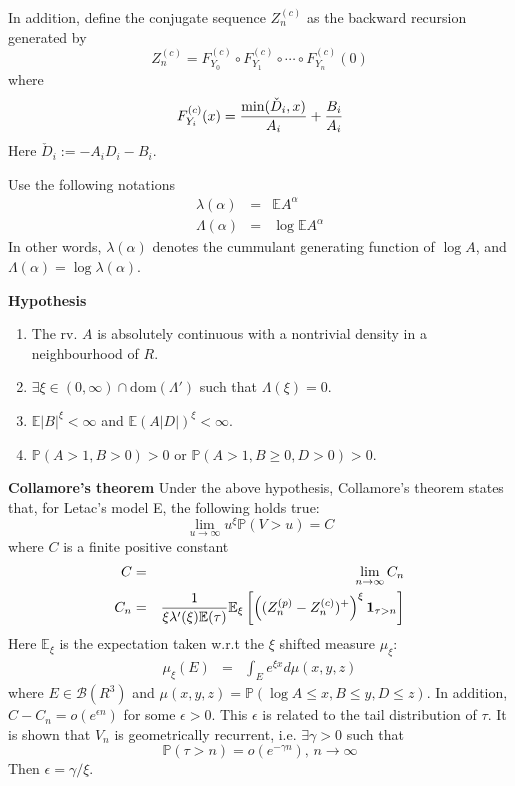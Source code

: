 \documentclass[12pt]{article}
\newcommand{\E}{
        \mathbb{E}
}
\newcommand{\p}{
        \mathbb{P}
}
\newcommand{\I}[1]{
        \mathbf 1_{#1}
}
\newcommand{\dom}{
        \text{dom}
}
\begin{document}
In addition, define the conjugate sequence $Z^{(c)}_n$ as
the backward recursion generated by
\[
Z^{(c)}_n = F^{(c)}_{Y_0} \circ F^{(c)}_{Y_1} \circ \cdots
\circ F^{(c)}_{Y_n}(0)
\]
where
\[
F^{(c)}_{Y_i}(x) = {\min(\check D_i, x) \over A_i} + {B_i \over A_i}
\]
Here $\check D_i := -A_i D_i - B_i$.

Use the following notations
\begin{eqnarray*}
\lambda(\alpha) &=& \E A^\alpha \\
\Lambda(\alpha) &=& \log \E A^\alpha
\end{eqnarray*}
In other words, $\lambda(\alpha)$ denotes the cummulant generating
function of $\log A$, and $\Lambda(\alpha) = \log \lambda(\alpha)$.

{\bf Hypothesis}
\begin{enumerate}
\item The rv. $A$ is absolutely continuous with a nontrivial
      density in a neighbourhood of $R$.
\item $\exists \xi \in (0, \infty) \cap \dom(\Lambda')$ such that
      $\Lambda(\xi) = 0$.
\item $\E|B|^\xi < \infty$ and $\E(A|D|)^\xi < \infty$.
\item $\p(A > 1, B > 0) > 0$ or $\p(A > 1, B \geq 0, D > 0) > 0$.
\end{enumerate}

{\bf Collamore's theorem}
Under the above hypothesis, Collamore's theorem states that, for
Letac's model E, the following holds true:
\[
\lim_{u \to \infty} u^\xi \p(V > u) = C
\]
where $C$ is a finite positive constant
\begin{eqnarray*}
  C &=& \lim_{n \to \infty} C_n \\
  C_n &=&     {1 \over \xi \lambda'(\xi) \E(\tau)}
    \E_\xi \left[
    \left(
    (Z^{(p)}_n - Z^{(c)}_n)^+
    \right)^\xi \I{\tau > n}
    \right]
\end{eqnarray*}
Here $\E_{\xi}$ is the expectation taken w.r.t the $\xi$ shifted
measure $\mu_\xi$:
\begin{eqnarray*}
  \mu_\xi(E) &=& \int_E e^{\xi x} d\mu(x, y, z)
\end{eqnarray*}
where $E \in \mathcal B(R^3)$ and $\mu(x, y, z) = \p(\log A \leq x, B
\leq y, D \leq z)$. In addition, $C - C_n = o(e^{\epsilon n})$ for
some $\epsilon > 0$. This $\epsilon$ is related to the tail
distribution of $\tau$. It is shown that $V_n$ is geometrically
recurrent, i.e. $\exists \gamma > 0$ such that
\[
\p(\tau > n) = o(e^{-\gamma n}) \text{, } n \to \infty
\]
Then $\epsilon = \gamma/\xi$.
\end{document}

